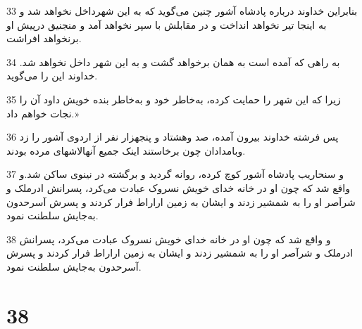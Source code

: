 \par 33 بنابراین خداوند درباره پادشاه آشور چنین می‌گوید که به این شهرداخل نخواهد شد و به اینجا تیر نخواهد انداخت و در مقابلش با سپر نخواهد آمد و منجنیق درپیش او برنخواهد افراشت.
\par 34 به راهی که آمده است به همان برخواهد گشت و به این شهر داخل نخواهد شد. خداوند این را می‌گوید.
\par 35 زیرا که این شهر را حمایت کرده، به‌خاطر خود و به‌خاطر بنده خویش داود آن را نجات خواهم داد.»
\par 36 پس فرشته خداوند بیرون آمده، صد وهشتاد و پنجهزار نفر از اردوی آشور را زد وبامدادان چون برخاستند اینک جمیع آنهالاشهای مرده بودند.
\par 37 و سنحاریب پادشاه آشور کوچ کرده، روانه گردید و برگشته در نینوی ساکن شد.و واقع شد که چون او در خانه خدای خویش نسروک عبادت می‌کرد، پسرانش ادرملک و شرآصر او را به شمشیر زدند و ایشان به زمین اراراط فرار کردند و پسرش آسرحدون به‌جایش سلطنت نمود.
\par 38 و واقع شد که چون او در خانه خدای خویش نسروک عبادت می‌کرد، پسرانش ادرملک و شرآصر او را به شمشیر زدند و ایشان به زمین اراراط فرار کردند و پسرش آسرحدون به‌جایش سلطنت نمود.
 
\chapter{38}

